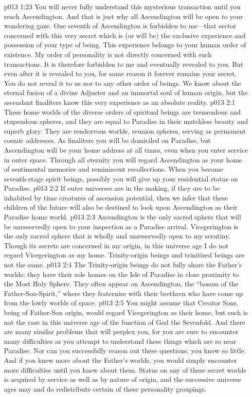 \vs p013 1:23 You will never fully understand this mysterious transaction until you reach Ascendington. And that is just why all Ascendington will be open to your wondering gaze. One seventh of Ascendington is forbidden to me---that sector concerned with this very secret which is (or will be) the exclusive experience and possession of your type of being. This experience belongs to your human order of existence. My order of personality is not directly concerned with such transactions. It is therefore forbidden to me and eventually revealed to you. But even after it is revealed to you, for some reason it forever remains your secret. You do not reveal it to us nor to any other order of beings. We know about the eternal fusion of a divine Adjuster and an immortal soul of human origin, but the ascendant finaliters know this very experience as an absolute reality.
\vs p013 2:1 These home worlds of the diverse orders of spiritual beings are tremendous and stupendous spheres, and they are equal to Paradise in their matchless beauty and superb glory. They are rendezvous worlds, reunion spheres, serving as permanent cosmic addresses. As finaliters you will be domiciled on Paradise, but Ascendington will be your home address at all times, even when you enter service in outer space. Through all eternity you will regard Ascendington as your home of sentimental memories and reminiscent recollections. When you become seventh\hyp{}stage spirit beings, possibly you will give up your residential status on Paradise.
\vs p013 2:2 If outer universes are in the making, if they are to be inhabited by time creatures of ascension potential, then we infer that these children of the future will also be destined to look upon Ascendington as their Paradise home world.
\pc \vs p013 2:3 Ascendington is the only sacred sphere that will be unreservedly open to your inspection as a Paradise arrival. Vicegerington is the only sacred sphere that is wholly and unreservedly open to my scrutiny. Though its secrets are concerned in my origin, in this universe age I do not regard Vicegerington as my home. Trinity\hyp{}origin beings and trinitized beings are not the same.
\pc \vs p013 2:4 The Trinity\hyp{}origin beings do not fully share the Father’s worlds; they have their sole homes on the Isle of Paradise in close proximity to the Most Holy Sphere. They often appear on Ascendington, the “bosom of the Father\hyp{}Son\hyp{}Spirit,” where they fraternize with their brethren who have come up from the lowly worlds of space.
\pc \vs p013 2:5 You might assume that Creator Sons, being of Father\hyp{}Son origin, would regard Vicegerington as their home, but such is not the case in this universe age of the function of God the Sevenfold. And there are many similar problems that will perplex you, for you are sure to encounter many difficulties as you attempt to understand these things which are so near Paradise. Nor can you successfully reason out these questions; you know so little. And if you knew more about the Father’s worlds, you would simply encounter more difficulties until you knew  about them. Status on any of these secret worlds is acquired by service as well as by nature of origin, and the successive universe ages may and do redistribute certain of these personality groupings.
